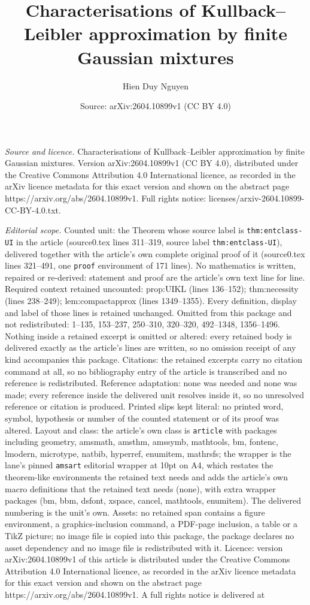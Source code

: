 \documentclass[10pt,a4paper]{amsart}
\title[Characterisations of Kullback--Leibler approximation by fini]{Characterisations of Kullback--Leibler approximation by finite Gaussian mixtures}
\author{Hien Duy Nguyen}
\date{Source: arXiv:2604.10899v1 (CC BY 4.0)}
\begin{document}
\maketitle

\noindent\emph{Source and licence.} Characterisations of Kullback--Leibler approximation by finite Gaussian mixtures. Version arXiv:2604.10899v1 (CC BY 4.0), distributed under the Creative Commons Attribution 4.0 International licence, as recorded in the arXiv licence metadata for this exact version and shown on the abstract page https://arxiv.org/abs/2604.10899v1. Full rights notice: licenses/arxiv-2604.10899-CC-BY-4.0.txt.\par\smallskip

\noindent\textit{Editorial scope.} Counted unit: the Theorem whose source label is \texttt{thm:entclass-UI} in the article (source0.tex lines 311--319, source label \texttt{thm:entclass-UI}), delivered together with the article's own complete original proof of it (source0.tex lines 321--491, one \texttt{proof} environment of 171 lines). No mathematics is written, repaired or re-derived: statement and proof are the article's own text line for line. Required context retained uncounted: prop:UIKL (lines 136--152); thm:necessity (lines 238--249); lem:compactapprox (lines 1349--1355). Every definition, display and label of those lines is retained unchanged. Omitted from this package and not redistributed: 1--135, 153--237, 250--310, 320--320, 492--1348, 1356--1496. Nothing inside a retained excerpt is omitted or altered: every retained body is delivered exactly as the article's lines are written, so no omission receipt of any kind accompanies this package. Citations: the retained excerpts carry no citation command at all, so no bibliography entry of the article is transcribed and no reference is redistributed. Reference adaptation: none was needed and none was made; every reference inside the delivered unit resolves inside it, so no unresolved reference or citation is produced. Printed slips kept literal: no printed word, symbol, hypothesis or number of the counted statement or of its proof was altered. Layout and class: the article's own class is \texttt{article} with packages including geometry, amsmath, amsthm, amssymb, mathtools, bm, fontenc, lmodern, microtype, natbib, hyperref, enumitem, mathrsfs; the wrapper is the lane's pinned \texttt{amsart} editorial wrapper at 10pt on A4, which restates the theorem-like environments the retained text needs and adds the article's own macro definitions that the retained text needs (none), with extra wrapper packages (bm, bbm, dsfont, xspace, cancel, mathtools, enumitem). The delivered numbering is the unit's own. Assets: no retained span contains a figure environment, a graphics-inclusion command, a PDF-page inclusion, a table or a TikZ picture; no image file is copied into this package, the package declares no asset dependency and no image file is redistributed with it. Licence: version arXiv:2604.10899v1 of this article is distributed under the Creative Commons Attribution 4.0 International licence, as recorded in the arXiv licence metadata for this exact version and shown on the abstract page https://arxiv.org/abs/2604.10899v1. A full rights notice is delivered at 
\end{document}
